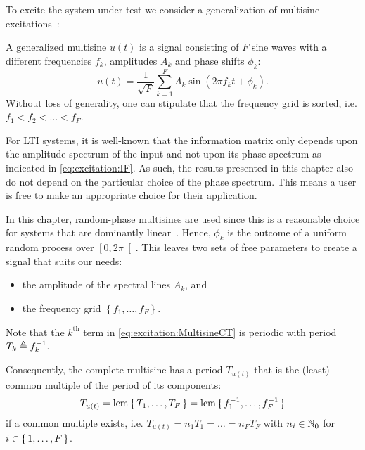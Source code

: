   To excite the system under test we consider a generalization of multisine excitations~\citep{Pintelon2012}:
  \begin{definition} \label{def:excitation:generalized-MS}
  A generalized multisine $u(t)$ is a signal consisting of $F$ sine waves with a different frequencies $f_k$, amplitudes $A_k$ and phase shifts $\phi_k$:
  \begin{equation}
    u \left( t\right) = \frac{1}{\sqrt{F}}
   \sum_{k=1}^{F} 
     A_k 
     \sin 
       \left(2\pi f_k t + \phi_k \right)
  \text{.}
  \label{eq:excitation:MultisineCT}
  \end{equation}
  Without loss of generality, one can stipulate that the frequency grid is sorted, i.e. $f_1 < f_2 < \ldots < f_F$.
  \end{definition}

  For \gls{LTI} systems, it is well-known that the information matrix only depends upon the amplitude spectrum of the input and not upon its phase spectrum as indicated in \eqref{eq:excitation:IF}.
  As such, the results presented in this chapter also do not depend on the particular choice of the phase spectrum.
  This means a user is free to make an appropriate choice for their application.
  
  In this chapter, random-phase multisines are used since this is a reasonable choice for systems that are dominantly linear~\citep{Schoukens2004}.
  Hence, $\phi_k$ is the outcome of a uniform random process over $\left[0,2\pi\right[$.
  This leaves two sets of free parameters to create a signal that suits our needs:
  \begin{itemize}
    \item the amplitude of the spectral lines $A_k$, and
    \item the frequency grid $\left\{f_1, \ldots, f_F \right\}$.
  \end{itemize}
  Note that the $k^{\text{th}}$ term in \eqref{eq:excitation:MultisineCT} is periodic with period $T_k \triangleq f_k^{-1}$.

  Consequently, the complete multisine has a period $T_{u(t)}$ that is the (least) common multiple of the period of its components:
  \begin{equation}
    T_{u(t)}  = \operatorname{lcm} \set{T_1, \ldots, T_F}
      = \operatorname{lcm} \set{f_1^{-1}, \ldots, f_F^{-1}}
  \end{equation}
  if a common multiple exists, i.e. $T_{u(t)} = n_1 T_1 = \ldots = n_F T_F$ with $n_i \in \mathbb{N}_{0}$ for $i \in \set{1,\ldots,F}$.

